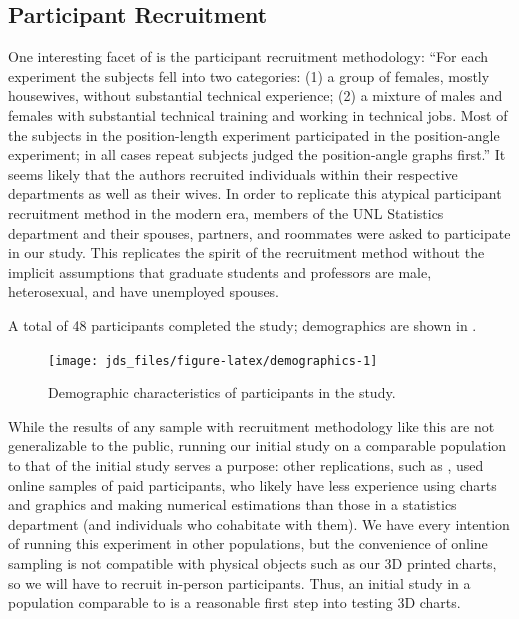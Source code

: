 \documentclass[letterpaper,inpress,dvipsnames]{jdsart}
\begin{document}
\hypertarget{participant-recruitment}{%
\subsection{Participant Recruitment}\label{participant-recruitment}}

One interesting facet of \citet{clevelandGraphical1984} is the participant recruitment methodology: ``For each experiment the subjects fell into two categories: (1) a group of females, mostly housewives, without substantial technical experience; (2) a mixture of males and females with substantial technical training and working in technical jobs.
Most of the subjects in the position-length experiment participated in the position-angle experiment; in all cases repeat subjects judged the position-angle graphs first.''
It seems likely that the authors recruited individuals within their respective departments as well as their wives.
In order to replicate this atypical participant recruitment method in the modern era, members of the UNL Statistics department and their spouses, partners, and roommates were asked to participate in our study.
This replicates the spirit of the recruitment method without the implicit assumptions that graduate students and professors are male, heterosexual, and have unemployed spouses.

A total of 48 participants completed the study; demographics are shown in .

\begin{figure}
\texttt{[image: jds\_files/figure-latex/demographics-1]} \caption{Demographic characteristics of participants in the study.}\label{fig:demographics}
\end{figure}

While the results of any sample with recruitment methodology like this are not generalizable to the public, running our initial study on a comparable population to that of the initial study serves a purpose: other replications, such as \citet{heerCrowdsourcingGraphicalPerception2010b}, used online samples of paid participants, who likely have less experience using charts and graphics and making numerical estimations than those in a statistics department (and individuals who cohabitate with them). We have every intention of running this experiment in other populations, but the convenience of online sampling is not compatible with physical objects such as our 3D printed charts, so we will have to recruit in-person participants. Thus, an initial study in a population comparable to \citet{clevelandGraphical1984} is a reasonable first step into testing 3D charts.
\end{document}
